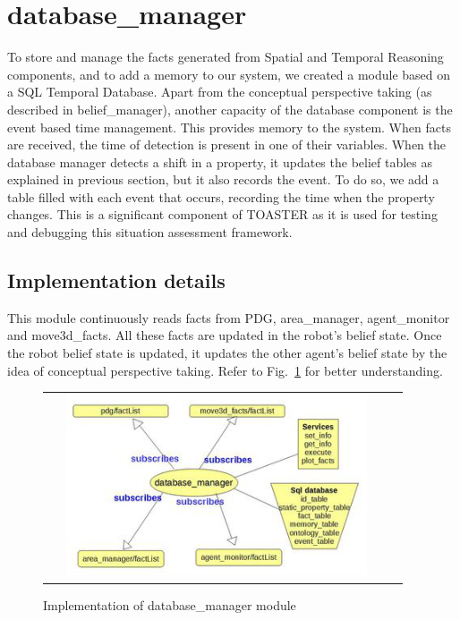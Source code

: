 \documentclass[a4paper]{article}
\begin{document}
\section{database\_manager}
To store and manage the facts generated from Spatial and Temporal Reasoning components, and to add a memory to our system, we created a module based on a SQL Temporal Database. Apart from the conceptual perspective taking (as described in belief\_manager), another capacity of the database component is the event based time management. This provides memory to the system.
When facts are received, the time of detection is present in one of their variables. When the database manager detects a shift in a property, it updates the belief tables as explained in previous section, but it also records the event. To do so, we add a table filled with each event that occurs, recording the time when the property changes. This is a significant component of TOASTER as it is used for testing and debugging this situation assessment framework.


\subsection{Implementation details}
This module continuously reads facts from PDG, area\_manager, agent\_monitor and move3d\_facts. All these facts are updated in the robot's belief state. Once the robot belief state is updated, it updates the other agent's belief state by the idea of conceptual perspective taking. Refer to Fig.~\ref{fig:databaseManager} for better understanding.
 \begin{figure}[ht!]
 \centering
 \begin{tabular}{cc}
  \includegraphics[width=0.90\textwidth]{img/database.png}
 \end{tabular}
 \caption{Implementation of database\_manager module}
 \label{fig:databaseManager}
 \end{figure}
\end{document}
